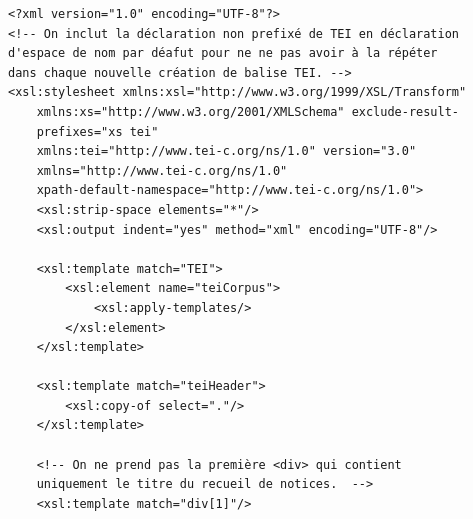 \documentclass[a4paper,12pt,twoside]{book}
\begin{document}
	\begin{verbatim}
<?xml version="1.0" encoding="UTF-8"?>
<!-- On inclut la déclaration non prefixé de TEI en déclaration 
d'espace de nom par déafut pour ne ne pas avoir à la répéter
dans chaque nouvelle création de balise TEI. -->
<xsl:stylesheet xmlns:xsl="http://www.w3.org/1999/XSL/Transform"
    xmlns:xs="http://www.w3.org/2001/XMLSchema" exclude-result-
    prefixes="xs tei" 
    xmlns:tei="http://www.tei-c.org/ns/1.0" version="3.0"
    xmlns="http://www.tei-c.org/ns/1.0"
    xpath-default-namespace="http://www.tei-c.org/ns/1.0">
    <xsl:strip-space elements="*"/>
    <xsl:output indent="yes" method="xml" encoding="UTF-8"/>
    
    <xsl:template match="TEI">
        <xsl:element name="teiCorpus">
            <xsl:apply-templates/>
        </xsl:element>
    </xsl:template>
    
    <xsl:template match="teiHeader">
        <xsl:copy-of select="."/>
    </xsl:template>
    
    <!-- On ne prend pas la première <div> qui contient 
    uniquement le titre du recueil de notices.  -->
    <xsl:template match="div[1]"/>
    

\end{verbatim}
\end{document}
